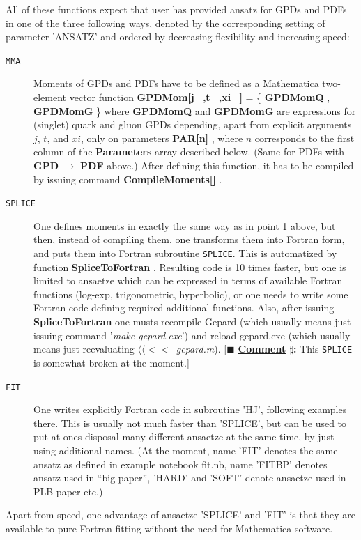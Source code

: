 \documentclass[12pt]{article}
\newcounter{comment}
\newcommand{\comminline}[1]{{%
\refstepcounter{comment}%
\ttfamily\small[$\blacksquare$ \textbf{\underline{Comment}
$\sharp$\thecomment:} #1]}}
\newcommand{\mmacomm}[1]{ {\ttfamily \bfseries #1} }
\begin{document}
All of these functions expect that user has provided ansatz for GPDs and PDFs
in one of the three following ways, denoted by the corresponding setting
of parameter 'ANSATZ' and ordered by decreasing flexibility and increasing speed:

\begin{description}
\item[\texttt{MMA}] 
Moments of GPDs and PDFs have to be defined as a Mathematica two-element vector function
\mmacomm{GPDMom[j\_,t\_,xi\_]} = \{\mmacomm{GPDMomQ}, \mmacomm{GPDMomG} \}  where 
\mmacomm{GPDMomQ} and \mmacomm{GPDMomG} are expressions for (singlet) quark and gluon GPDs
depending, apart from explicit arguments $j$, $t$, and $xi$, only on
parameters \mmacomm{PAR[n]}, where $n$ corresponds to the first column of the \mmacomm{Parameters}
array described below. (Same for PDFs with \mmacomm{GPD}$\to$\mmacomm{PDF} above.) 
After defining this function, it has to be compiled by issuing command \mmacomm{CompileMoments[]}.

\item[\texttt{SPLICE}] 
One defines moments in exactly the same way as in point 1 above, but then, instead of compiling
them, one transforms them into Fortran form, and puts them into Fortran subroutine
\texttt{SPLICE}. This is automatized by function \mmacomm{SpliceToFortran}. Resulting code
is 10 times faster, but one is limited to ansaetze which can be expressed in terms of available
Fortran functions (log-exp, trigonometric, hyperbolic), or one needs to write some
Fortran code defining required additional functions. Also, after issuing \mmacomm{SpliceToFortran}
one musts recompile Gepard (which usually means just issuing command '\emph{make gepard.exe}')
and reload gepard.exe (which usually means just reevaluating $\langle\langle<<$~\emph{gepard.m}).
\comminline{This \texttt{SPLICE} is somewhat broken at the moment.}

\item[\texttt{FIT}] 
One writes explicitly Fortran code in subroutine 'HJ', following examples there. This
is usually not much faster than 'SPLICE', but can be used to put at ones disposal
many different ansaetze at the same time, by just using additional names.
(At the moment, name 'FIT' denotes the same ansatz as defined in example notebook fit.nb,
name 'FITBP' denotes ansatz used in ``big paper'', 'HARD' and 'SOFT' denote ansaetze used in
PLB paper etc.)
\end{description}

Apart from speed, one advantage of ansaetze 'SPLICE' and 'FIT' is that they are
available to pure Fortran fitting without the need for Mathematica software.
\end{document}
